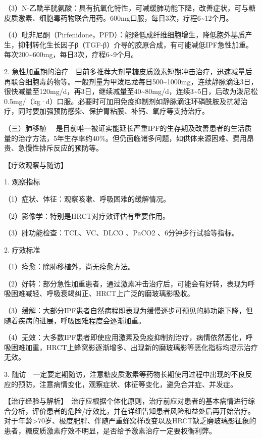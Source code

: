 （3）N-乙酰半胱氨酸：具有抗氧化特性，可减缓肺功能下降，改善症状，可与糖皮质激素、细胞毒药物联合用药。600mg口服，每日3次，疗程6\textasciitilde{}12个月。

（4）吡非尼酮（Pirfenidone，PFD）：能降低成纤维细胞增生，降低胞外基质产生，抑制转化生长因子β（TGF-β）介导的胶原合成，有可能减低IPF急性加重。每次200\textasciitilde{}600mg，每日3次，疗程6\textasciitilde{}9个月。

2.
急性加重期的治疗　目前多推荐大剂量糖皮质激素短期冲击治疗，迅速减量后再联合细胞毒药物等。一般剂量为甲泼尼龙每日500\textasciitilde{}1000mg，连续静脉滴注3日，很快减量至120mg/d，再3日，继续减量至40\textasciitilde{}80mg/d，连续3\textasciitilde{}5日，后改为泼尼松0.5mg/（kg·d）口服。必要时可加用免疫抑制剂如静脉滴注环磷酰胺及抗凝治疗，同时要加强预防感染、保护胃粘膜、补钙、氧疗等支持治疗。

{（三）肺移植}
　是目前唯一被证实能延长严重IPF的生存期及改善患者的生活质量的治疗方法，5年生存率约40\%。但仍面临诸多问题，如供体来源困难、费用昂贵、急慢性排斥反应的预防等。

【疗效观察与随访】

1. 观察指标

（1）症状、体征：观察咳嗽、呼吸困难的缓解情况。

（2）影像学：特别是HRCT对疗效评估有重要作用。

（3）肺功能检查：TCL、VC、DL{CO} 、PaCO{2} 、6分钟步行试验等指标。

2. 疗效标准

（1）痊愈：除肺移植外，尚无痊愈方法。

（2）好转：部分急性加重患者，通过激素冲击治疗后，可能会有好转，表现为呼吸困难减轻、呼吸衰竭纠正、HRCT上广泛的磨玻璃影吸收。

（3）缓解：大部分IPF患者自然病程即表现为缓慢逐步可预见的肺功能下降，但随着疾病的进展，呼吸困难程度会逐渐加重。

（4）无效：大多数IPF患者即使应用激素及免疫抑制剂治疗，病情依然恶化，呼吸困难加重，HRCT上蜂窝影逐渐增多、出现新的磨玻璃影等恶化指标均提示治疗无效。

3.
随访　一定要定期随访，注意糖皮质激素等药物长期使用过程中出现的不良反应的预防，注意病情变化，观察症状、体征等变化，避免合并症、并发症。

【治疗经验与解析】　治疗应根据个体化原则，治疗前应对患者的基本病情进行综合分析，评价患者的危险/疗效比，并在详细告知患者风险和益处后再开始治疗。对于年龄\textgreater{}70岁、极度肥胖、伴随严重蜂窝样改变以及HRCT缺乏磨玻璃影征象的患者，糖皮质激素疗效不明显，是否给予激素治疗一定要权衡利弊。

